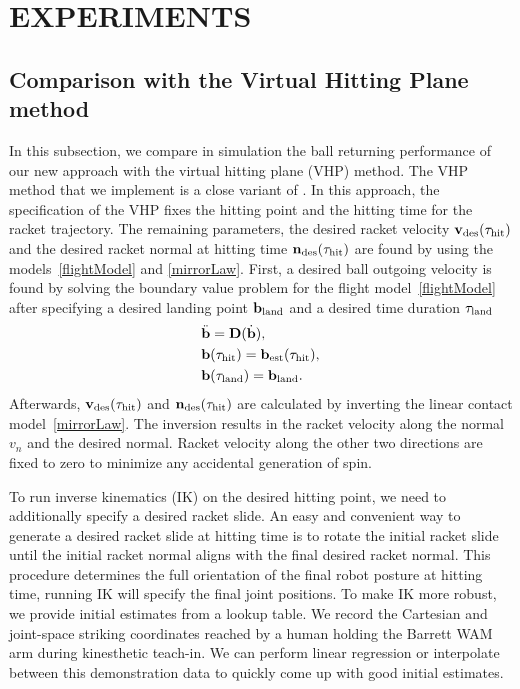 \section{EXPERIMENTS}\label{results}

\subsection{Comparison with the Virtual Hitting Plane method}

In this subsection, we compare in simulation the ball returning performance of our new approach with the virtual hitting plane (VHP) method. The VHP method that we implement is a close variant of \cite{Muelling13}. In this approach, the specification of the VHP fixes the hitting point and the hitting time for the racket trajectory. The remaining parameters, the desired racket velocity $\boldsymbol{\mathrm{v}}_{\mathrm{des}}(\tau_{\mathrm{hit}})$ and the desired racket normal at hitting time $\boldsymbol{\mathrm{n}}_{\mathrm{des}}(\tau_{\mathrm{hit}})$ are found by using the models~\eqref{flightModel} and \eqref{mirrorLaw}. First, a desired ball outgoing velocity is found by solving the boundary value problem for the flight model~\eqref{flightModel} after specifying a desired landing point $\boldsymbol{\mathrm{b}}_{\mathrm{land}}$ and a desired time duration $\tau_{\mathrm{land}}$
%
\begin{align}
&\ddot{\boldsymbol{\mathrm{b}}} = \boldsymbol{\mathrm{D}}(\dot{\boldsymbol{\mathrm{b}}}), \\
&\boldsymbol{\mathrm{b}}(\tau_{\mathrm{hit}}) = \boldsymbol{\mathrm{b}}_{\mathrm{est}}(\tau_{\mathrm{hit}}), \\
&\boldsymbol{\mathrm{b}}(\tau_{\mathrm{land}}) = \boldsymbol{\mathrm{b}}_{\mathrm{land}}.
\label{bvp}
\end{align}
%
Afterwards, $\boldsymbol{\mathrm{v}}_{\mathrm{des}}(\tau_{\mathrm{hit}})$ and $\boldsymbol{\mathrm{n}}_{\mathrm{des}}(\tau_{\mathrm{hit}})$ are calculated by inverting the linear contact model~\eqref{mirrorLaw}. The inversion results in the racket velocity along the normal $v_n$ and the desired normal. Racket velocity along the other two directions are fixed to zero to minimize any accidental generation of spin.

To run inverse kinematics (IK) on the desired hitting point, we need to additionally specify a desired racket slide. An easy and convenient way to generate a desired racket slide at hitting time is to rotate the initial racket slide until the initial racket normal aligns with the final desired racket normal. This procedure determines the full orientation of the final robot posture at hitting time, running IK will specify the final joint positions. To make IK more robust, we provide initial estimates from a lookup table. We record the Cartesian and joint-space striking coordinates reached by a human holding the Barrett WAM arm during kinesthetic teach-in. We can perform linear regression or interpolate between this demonstration data to quickly come up with good initial estimates.

